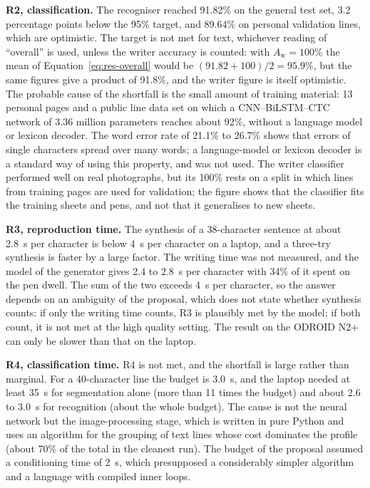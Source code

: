         \textbf{R2, classification.}
        The recogniser reached 91.82\% on the general test set, 3.2 percentage points below the 95\% target, and 89.64\% on personal validation lines, which are optimistic.
        The target is not met for text, whichever reading of ``overall'' is used, unless the writer accuracy is counted: with $A_{\mathrm{w}}=100\%$ the mean of Equation~\ref{eq:res-overall} would be $(91.82+100)/2=95.9\%$, but the same figures give a product of 91.8\%, and the writer figure is itself optimistic.
        The probable cause of the shortfall is the small amount of training material: 13 personal pages and a public line data set on which a CNN--BiLSTM--CTC network of 3.36 million parameters reaches about 92\%, without a language model or lexicon decoder.
        The word error rate of 21.1\% to 26.7\% shows that errors of single characters spread over many words; a language-model or lexicon decoder is a standard way of using this property, and was not used.
        The writer classifier performed well on real photographs, but its 100\% rests on a split in which lines from training pages are used for validation; the figure shows that the classifier fits the training sheets and pens, and not that it generalises to new sheets.

        \textbf{R3, reproduction time.}
        The synthesis of a 38-character sentence at about 2.8~s per character is below 4~s per character on a laptop, and a three-try synthesis is faster by a large factor.
        The writing time was not measured, and the model of the generator gives 2.4 to 2.8~s per character with 34\% of it spent on the pen dwell.
        The sum of the two exceeds 4~s per character, so the answer depends on an ambiguity of the proposal, which does not state whether synthesis counts: if only the writing time counts, R3 is plausibly met by the model; if both count, it is not met at the high quality setting.
        The result on the ODROID N2+ can only be slower than that on the laptop.

        \textbf{R4, classification time.}
        R4 is not met, and the shortfall is large rather than marginal.
        For a 40-character line the budget is 3.0~s, and the laptop needed at least 35~s for segmentation alone (more than 11 times the budget) and about 2.6 to 3.0~s for recognition (about the whole budget).
        The cause is not the neural network but the image-processing stage, which is written in pure Python and uses an algorithm for the grouping of text lines whose cost dominates the profile (about 70\% of the total in the cleanest run).
        The budget of the proposal assumed a conditioning time of 2~s, which presupposed a considerably simpler algorithm and a language with compiled inner loops.

